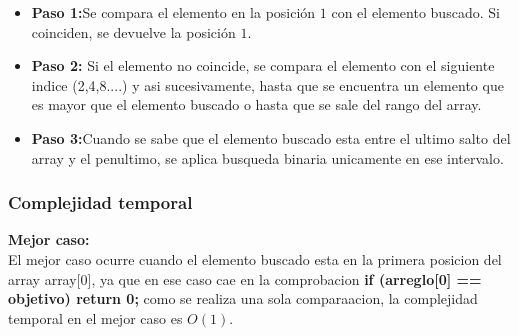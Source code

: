 \documentclass[9pt,letterpaper,onecolumn]{rho-class/rho}
\begin{document}
    \begin{itemize}
        \item \textbf{Paso 1:}Se compara el elemento en la posición $1$ con el elemento 
        buscado. Si coinciden, se devuelve la posición $1$.
        \item \textbf{Paso 2:} Si el elemento no coincide, se compara el elemento con el siguiente indice (2,4,8....)
        y asi sucesivamente, hasta que se encuentra un elemento que es mayor que el elemento 
        buscado o hasta que se sale del rango del array.
        \item \textbf{Paso 3:}Cuando se sabe que el elemento buscado esta entre el ultimo salto
        del array y el penultimo, se aplica busqueda binaria unicamente en ese intervalo.
    \end{itemize}

    \subsubsection{Complejidad temporal}
    \textbf{Mejor caso:}\\
    El mejor caso ocurre cuando el elemento buscado esta en la primera posicion del array array[0],
    ya que en ese caso cae en la comprobacion \textbf{if (arreglo[0] == objetivo) return 0;}
    como se realiza una sola comparaacion, la complejidad temporal en el mejor caso es $O(1)$.
\end{document}
